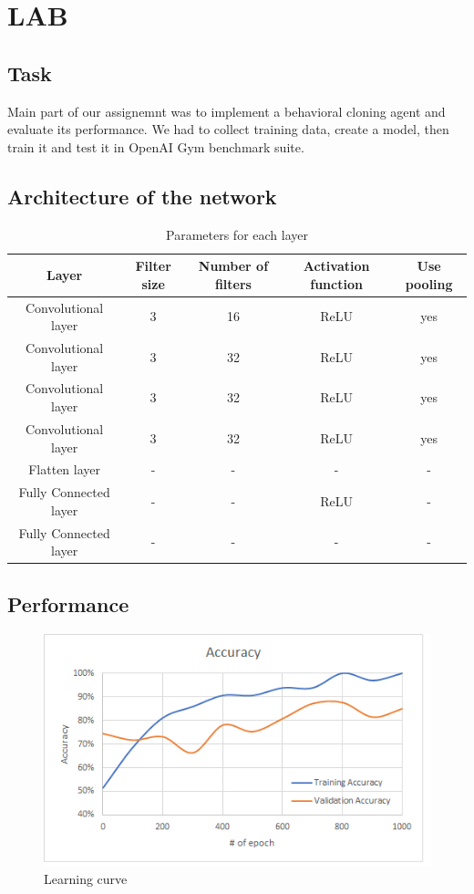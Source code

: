 \documentclass{scrartcl}
\begin{document}
\section*{LAB}
\subsection*{Task}
Main part of our assignemnt was to implement a behavioral cloning agent and evaluate its performance. We had to collect training data, create a model, then train it and test it in OpenAI Gym benchmark suite.

\subsection*{Architecture of the network}

\begin{table}[h]
	\centering
\begin{tabular}{|c||c|c||c||c|}
	\hline
	\textbf{Layer} & \textbf{Filter size} & \textbf{Number of filters} & \textbf{Activation function} & \textbf{Use pooling}  \\ \hline \hline
	Convolutional layer & 3 & 16 & ReLU & yes \\ \hline
	Convolutional layer & 3 & 32  & ReLU & yes \\ \hline
	Convolutional layer & 3  & 32 & ReLU & yes \\ \hline
	Convolutional layer & 3 & 32 & ReLU & yes \\ \hline
	Flatten layer & -  & - & - & -  \\ \hline
	Fully Connected layer  & - & - & ReLU & - \\ \hline
	Fully Connected layer  & - & - & - & - \\ \hline	
\end{tabular}
\caption{Parameters for each layer}
\end{table}

\subsection*{Performance}

\begin{figure}[H]
	\centering
	\includegraphics[scale=0.6]{Accuracy}
	\caption{Learning curve}
	\label{fig:1}
\end{figure}
\end{document}
